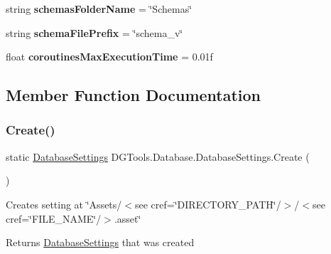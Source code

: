 \begin{DoxyCompactItemize}
\mbox{\label{class_d_g_tools_1_1_database_1_1_database_settings_aa9c6ad4f53a808df19f237bb7502ac1e}} 
string {\bfseries schemas\+Folder\+Name} = \char`\"{}Schemas\char`\"{}
\item 
\mbox{\label{class_d_g_tools_1_1_database_1_1_database_settings_aaffe0221c19d9902d0d793d07fbe087f}} 
string {\bfseries schema\+File\+Prefix} = \char`\"{}schema\+\_\+v\char`\"{}
\item 
\mbox{\label{class_d_g_tools_1_1_database_1_1_database_settings_a46de5b2005bc80f1d2dfb9fce329890a}} 
float {\bfseries coroutines\+Max\+Execution\+Time} = 0.\+01f
\end{DoxyCompactItemize}


\subsection{Member Function Documentation}
\mbox{\label{class_d_g_tools_1_1_database_1_1_database_settings_a276623c57d9ad733ac656b4acfdda666}} 
\subsubsection{\texorpdfstring{Create()}{Create()}}
{\footnotesize\ttfamily static \mbox{\hyperlink{class_d_g_tools_1_1_database_1_1_database_settings}{Database\+Settings}} D\+G\+Tools.\+Database.\+Database\+Settings.\+Create (\begin{DoxyParamCaption}{ }\end{DoxyParamCaption})\hspace{0.3cm}{\ttfamily [static]}}



Creates setting at \char`\"{}\+Assets/$<$see cref=\char`\"{}D\+I\+R\+E\+C\+T\+O\+R\+Y\+\_\+\+P\+A\+TH\char`\"{}/$>$/$<$see cref=\char`\"{}F\+I\+L\+E\+\_\+\+N\+A\+ME\char`\"{}/$>$.\+asset\char`\"{} 

\begin{DoxyReturn}{Returns}
\mbox{\hyperlink{class_d_g_tools_1_1_database_1_1_database_settings}{Database\+Settings}} that was created
\end{DoxyReturn}
\mbox{\label{class_d_g_tools_1_1_database_1_1_database_settings_af3911150d87eb4225af54c4ca00f426e}} 
